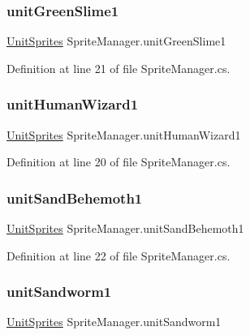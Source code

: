 \subsubsection{\texorpdfstring{unitGreenSlime1}{unitGreenSlime1}}
{\footnotesize\ttfamily \mbox{\hyperlink{class_unit_sprites}{Unit\+Sprites}} Sprite\+Manager.\+unit\+Green\+Slime1}



Definition at line 21 of file Sprite\+Manager.\+cs.

\mbox{\label{class_sprite_manager_a4f4c6fae4516ee557d4929d477cc1d67}} 
\subsubsection{\texorpdfstring{unitHumanWizard1}{unitHumanWizard1}}
{\footnotesize\ttfamily \mbox{\hyperlink{class_unit_sprites}{Unit\+Sprites}} Sprite\+Manager.\+unit\+Human\+Wizard1}



Definition at line 20 of file Sprite\+Manager.\+cs.

\mbox{\label{class_sprite_manager_af74d4c124738af254d099adae12a920c}} 
\subsubsection{\texorpdfstring{unitSandBehemoth1}{unitSandBehemoth1}}
{\footnotesize\ttfamily \mbox{\hyperlink{class_unit_sprites}{Unit\+Sprites}} Sprite\+Manager.\+unit\+Sand\+Behemoth1}



Definition at line 22 of file Sprite\+Manager.\+cs.

\mbox{\label{class_sprite_manager_af6b6092b09e977440c9c301fcce90a9c}} 
\subsubsection{\texorpdfstring{unitSandworm1}{unitSandworm1}}
{\footnotesize\ttfamily \mbox{\hyperlink{class_unit_sprites}{Unit\+Sprites}} Sprite\+Manager.\+unit\+Sandworm1}



